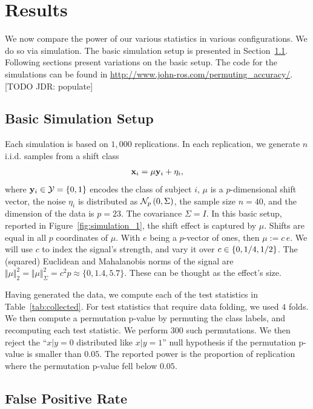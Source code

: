 \documentclass[12pt,a4paper]{article}
\begin{document}
\section{Results}
\label{sec:results}
We now compare the power of our various statistics in various configurations. 
We do so via simulation.
The basic simulation setup is presented in Section~\ref{sec:simulation_details}.
Following sections present variations on the basic setup.
The \R code for the simulations can be found in \url{http://www.john-ros.com/permuting_accuracy/}.[TODO JDR: populate]


\subsection{Basic Simulation Setup}
\label{sec:simulation_details}

Each simulation is based on $1,000$ replications. 
In each replication, we generate $n$ i.i.d. samples from a shift class 
\begin{align}
\label{eq:distribution}
	\mathbf{x}_i = \mu \mathbf{y}_i + \eta_i,
\end{align}
where $\mathbf{y}_i \in \mathcal{Y}=\{ 0,1 \}$ encodes the class of subject $i$, $\mu$ is a $p$-dimensional shift vector, the noise $\eta_i$ is distributed as $\mathcal{N}_{p}\left(0,\Sigma\right)$, the sample size $n=40$, and the dimension of the data is $p=23$. 
The covariance $\Sigma=I$. 
In this basic setup, reported in Figure~\ref{fig:simulation_1}, the shift effect is captured by $\mu$. 
Shifts are equal in all $p$ coordinates of $\mu$.
With $e$ being a $p$-vector of ones, then $\mu:=c \, e$. 
We will use $c$ to index the signal's strength, and vary it over $c \in \{ 0,1/4,1/2 \}$.
The (squared) Euclidean and Mahalanobis norms of the signal are $\Vert \mu \Vert_2^2=\Vert \mu \Vert_\Sigma^2=c^2 p\approx \{0,1.4,5.7\}$.
These can be thought as the effect's size. 


Having generated the data, we compute each of the test statistics in Table~\ref{tab:collected}.
For test statistics that require data folding, we used $4$ folds. 
We then compute a permutation p-value by permuting the class labels, and recomputing each test statistic. 
We perform $300$ such permutations. 
We then reject the ``$x|y=0$ distributed like $x|y=1$'' null hypothesis if the permutation p-value is smaller than $0.05$.
The reported power is the proportion of replication where the permutation p-value fell below $0.05$.



\subsection{False Positive Rate}
\label{sec:type_i}
\end{document}
